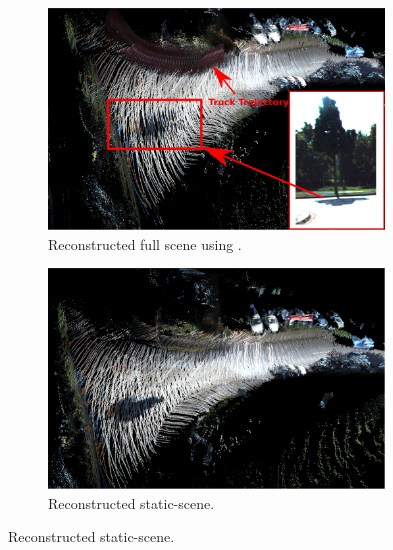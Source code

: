\documentclass[10pt,twocolumn,letterpaper]{article}  %
\begin{document}
\begin{figure}[t]
  \centering
  \begin{subfigure}{0.5\textwidth}
 	\centering
  	\includegraphics[height=0.24\textheight, width=0.98\textwidth]{image/truck_full_tree.eps}
  	\caption{Reconstructed full scene using \cite{c31}.}
  	\label{fig:truck_full_tree} 
  	\end{subfigure}%
	\begin{subfigure}{0.5\textwidth}
  	\centering
 	\includegraphics[height=0.24\textheight, width=0.98\textwidth]{image/truck_static_tree.eps}
  	\caption{Reconstructed static-scene.}
  	\label{fig:truck_static_tree}
	\end{subfigure}%
	

\end{figure}
\end{document}
